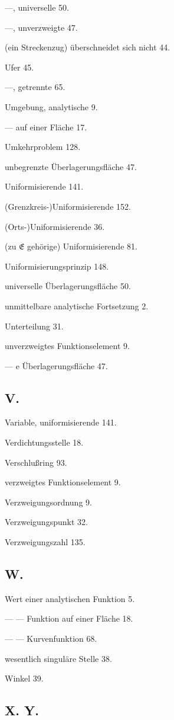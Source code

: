 \documentclass{article}
\begin{document}
---, universelle 50.

---, unverzweigte 47.

(ein Streckenzug) überschneidet sich nicht 44.

Ufer 45.

---, getrennte 65.

Umgebung, analytische 9.

--- auf einer Fläche 17.

Umkehrproblem 128.

unbegrenzte Überlagerungsfläche 47.

Uniformisierende 141.

(Grenzkreis-)Uniformisierende 152.

(Orts-)Uniformisierende 36.

(zu $\mathfrak{E}$ gehörige) Uniformisierende 81.

Uniformisierungsprinzip 148.

universelle Überlagerungsfläche 50.

unmittelbare analytische Fortsetzung 2.

Unterteilung 31.

unverzweigtes Funktionselement 9.

--- e Überlagerungsfläche 47.

\subsection*{V.}

Variable, uniformisierende 141.

Verdichtungsstelle 18.

Verschlußring 93.

verzweigtes Funktionselement 9.

Verzweigungsordnung 9.

Verzweigungspunkt 32.

Verzweigungszahl 135.

\subsection*{W.}

Wert einer analytischen Funktion 5.

--- --- Funktion auf einer Fläche 18.

--- --- Kurvenfunktion 68.

wesentlich singuläre Stelle 38.

Winkel 39.

\subsection*{X. Y.}
\end{document}
